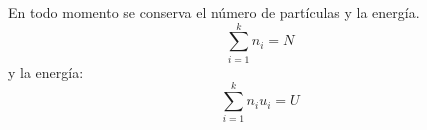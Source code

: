 En todo momento se conserva el número de partículas y la energía.
\begin{equation}
  \sum_{i=1}^{k} n_i = N
\end{equation}
y la energía:
\begin{equation}
  \sum_{i=1}^{k} n_i u_i = U
\end{equation}












